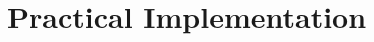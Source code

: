 \documentclass[preprint]{sigplanconf}
\newtheorem{definition}{Definition}
\newtheorem{proposition}{Proposition}
\begin{document}
%
\section{Practical Implementation} \label{sec:imp}
\end{document}
